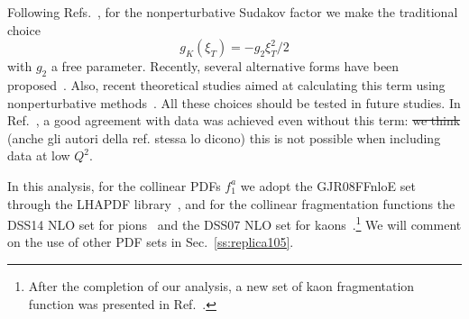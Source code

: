 \documentclass[aps,preprintnumbers,showpacs,nofootinbib,superscriptaddress,floatfix]{revtex4}
\newcommand{\AS}[1]{{\textcolor[rgb]{1,0,1}{#1}}}
\newcommand{\bT}{\xi_T}
\begin{document}


Following Refs.~\cite{Nadolsky:1999kb,Landry:2002ix,Konychev:2005iy}, for the
nonperturbative Sudakov factor we make the traditional choice 
\begin{equation}
g_K (\bT) = - g_2 \bT^2 / 2
\end{equation} 
with $g_2$ a free parameter. Recently, several alternative
forms have been proposed~\cite{Aidala:2014hva,Collins:2014jpa}. Also, recent
theoretical studies aimed at calculating this term using nonperturbative
methods~\cite{Scimemi:2016ffw}.  
All these
choices should be tested in future studies. In Ref.~\cite{D'Alesio:2014vja}, a
good agreement with data was achieved even without this term: \AS{\sout{we think} (anche gli autori della ref. stessa lo dicono)} this is
not possible when including data at low $Q^2$.

In this analysis, for the collinear PDFs $f_1^a$ we adopt the GJR08FFnloE
set~\cite{Gluck:2007ck} through the LHAPDF library~\cite{Buckley:2014ana}, and
for the collinear fragmentation functions 
the DSS14 NLO set for
pions~\cite{deFlorian:2014xna} and the DSS07 NLO set for
kaons~\cite{deFlorian:2007aj}.\footnote{After the completion of our analysis, 
a new set of kaon
  fragmentation function was presented in Ref.~\cite{deFlorian:2017lwf}.} We
will comment on the use of other PDF sets in Sec.~\ref{ss:replica105}.
\end{document}
